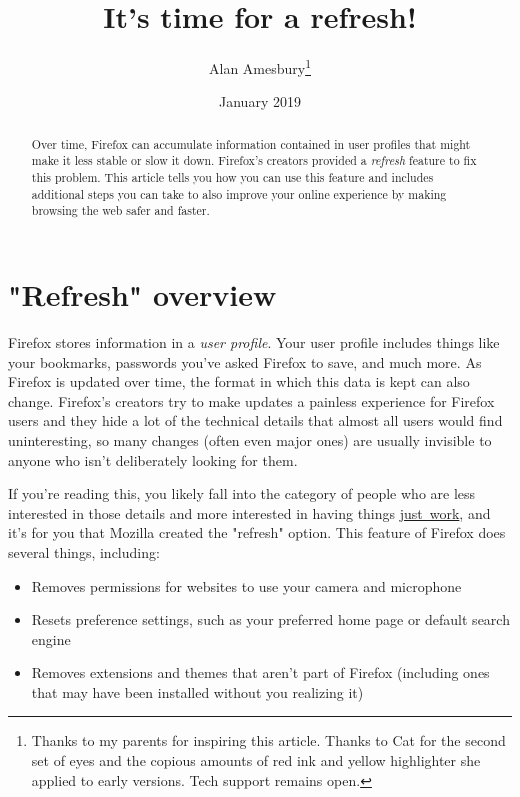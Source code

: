 \documentclass{tufte-handout}
\begin{document}
\title{It's time for a refresh!}
\author{Alan Amesbury\thanks{Thanks to my parents for inspiring this article.  Thanks to Cat for the second set of eyes and the copious amounts of red ink and yellow highlighter she applied to early versions.  Tech support remains open.}}
\date{January 2019}


\maketitle

\begin{abstract}{Over time, Firefox can accumulate information contained in user profiles that might make it less stable or slow it down.  Firefox's creators provided a \emph{refresh} feature to fix this problem.  This article tells you how you can use this feature and includes additional steps you can take to also improve your online experience by making browsing the web safer and faster.}
\end{abstract}




\section{"Refresh" overview}
Firefox stores information in a \emph{user profile}.  Your user profile includes things like your bookmarks, passwords you've asked Firefox to save, and much more.  As Firefox is updated over time, the format in which this data is kept can also change.  Firefox's creators try to make updates a painless experience for Firefox users and they hide a lot of the technical details that almost all users would find uninteresting, so many changes (often even major ones) are usually invisible to anyone who isn't deliberately looking for them.

If you're reading this, you likely fall into the category of people who are less interested in those details and more interested in having things \underline{just~work}, and it's for you that Mozilla created the "refresh" option.  This feature of Firefox does several things, including:
\begin{itemize}
	\item{Removes permissions for websites to use your camera and microphone}
	\item{Resets preference settings, such as your preferred home page or default search engine}
	\item{Removes extensions and themes that aren't part of Firefox (including ones that may have been installed without you realizing it)}
\end{itemize}
\end{document}
